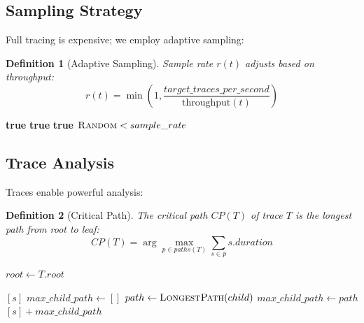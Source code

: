 \documentclass[11pt,a4paper]{article}
\newtheorem{definition}{Definition}
\begin{document}
\subsection{Sampling Strategy}

Full tracing is expensive; we employ adaptive sampling:

\begin{definition}[Adaptive Sampling]
Sample rate $r(t)$ adjusts based on throughput:
\[
r(t) = \min\left(1, \frac{target\_traces\_per\_second}{\text{throughput}(t)}\right)
\]
\end{definition}

\begin{algorithm}
\caption{Priority Sampling}
\begin{algorithmic}[1]
        \State \Return \textbf{true} 
    \EndIf
        \State \Return \textbf{true} 
    \EndIf
        \State \Return \textbf{true}
    \EndIf
    \State \Return $\Call{Random}{} < sample\_rate$
\EndProcedure
\end{algorithmic}
\end{algorithm}

\subsection{Trace Analysis}

Traces enable powerful analysis:

\begin{definition}[Critical Path]
The critical path $CP(T)$ of trace $T$ is the longest path from root to leaf:
\[
CP(T) = \arg\max_{p \in paths(T)} \sum_{s \in p} s.duration
\]
\end{definition}

\begin{algorithm}
\caption{Critical Path Analysis}
\begin{algorithmic}[1]
    \State $root \gets T.root$
    \State \Return {}
\EndProcedure

        \State \Return $[s]$
    \EndIf
    \State $max\_child\_path \gets []$
        \State $path \gets \Call{LongestPath}{child}$
            \State $max\_child\_path \gets path$
        \EndIf
    \EndFor
    \State \Return $[s] + max\_child\_path$
\EndProcedure
\end{algorithmic}
\end{algorithm}
\end{document}
